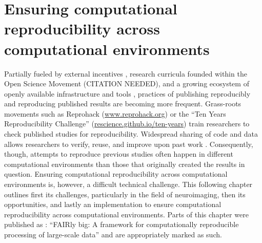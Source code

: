 


\chapter{Ensuring computational reproducibility across computational environments}
\label{chap:k3}

Partially fueled by external incentives \citep{mckiernan2016open} \citep{dfg}, research curricula founded within the Open Science Movement (CITATION NEEDED), and a growing ecosystem of openly available infrastructure and tools \citep{NISO2022119623}, practices of publishing reproducibly and reproducing published results are becoming more frequent.
Grass-roots movements such as Reprohack (\href{https://www.reprohack.org/}{www.reprohack.org}) or the ``Ten Years Reproducibility Challenge'' (\href{https://rescience.github.io/ten-years/}{rescience.github.io/ten-years}) train researchers to check published studies for reproducibility.
Widespread sharing of code and data allows researchers to verify, reuse, and improve upon past work \citep{borghi2018data}.
Consequently, though, attempts to reproduce previous studies often happen in different computational environments than those that originally created the results in question.
Ensuring computational reproducibility across computational environments is, however, a difficult technical challenge.
This following chapter outlines first its challenges, particularly in the field of neuroimaging, then its opportunities, and lastly an implementation to ensure computational reproducibility across computational environments.
Parts of this chapter were published as \citet{wagner2022fairly}: ``FAIRly big: A framework for computationally reproducible processing of large-scale data'' and are appropriately marked as such.


